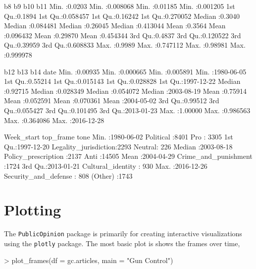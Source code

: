\documentclass{article}
\begin{document}
\begin{Schunk}
\begin{Soutput}
       b8               b9                b10               b11          
 Min.   :0.0203   Min.   :0.008068   Min.   :0.01185   Min.   :0.001205  
 1st Qu.:0.1894   1st Qu.:0.058457   1st Qu.:0.16242   1st Qu.:0.270052  
 Median :0.3040   Median :0.084481   Median :0.26045   Median :0.413044  
 Mean   :0.3564   Mean   :0.096432   Mean   :0.29870   Mean   :0.454344  
 3rd Qu.:0.4837   3rd Qu.:0.120522   3rd Qu.:0.39959   3rd Qu.:0.608833  
 Max.   :0.9989   Max.   :0.747112   Max.   :0.98981   Max.   :0.999978  
                                                                         
      b12               b13                b14                date           
 Min.   :0.00935   Min.   :0.000665   Min.   :0.005891   Min.   :1980-06-05  
 1st Qu.:0.55214   1st Qu.:0.015143   1st Qu.:0.028828   1st Qu.:1997-12-22  
 Median :0.92715   Median :0.028349   Median :0.054072   Median :2003-08-19  
 Mean   :0.75914   Mean   :0.052591   Mean   :0.070361   Mean   :2004-05-02  
 3rd Qu.:0.99512   3rd Qu.:0.055427   3rd Qu.:0.101495   3rd Qu.:2013-01-23  
 Max.   :1.00000   Max.   :0.986563   Max.   :0.364086   Max.   :2016-12-28  
                                                                             
   Week_start                         top_frame         tone      
 Min.   :1980-06-02   Political            :8401   Pro    : 3305  
 1st Qu.:1997-12-20   Legality_jurisdiction:2293   Neutral:  226  
 Median :2003-08-18   Policy_prescription  :2137   Anti   :14505  
 Mean   :2004-04-29   Crime_and_punishment :1724                  
 3rd Qu.:2013-01-21   Cultural_identity    : 930                  
 Max.   :2016-12-26   Security_and_defense : 808                  
                      (Other)              :1743                  
\end{Soutput}
\end{Schunk}


\section{Plotting}

The \texttt{PublicOpinion} package is primarily for creating interactive
visualizations using the \texttt{plotly} package. The most basic plot is
shows the frames over time,

\begin{Schunk}
\begin{Sinput}
> plot_frames(df = gc.articles, main = "Gun Control")
\end{Sinput}
\end{Schunk}
\end{document}
